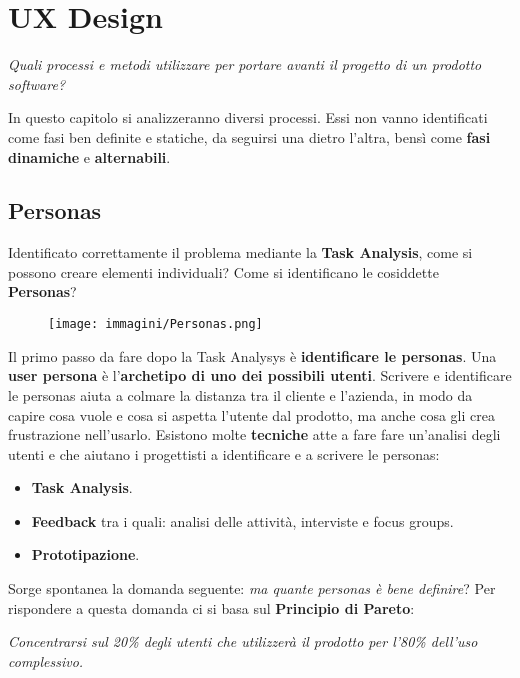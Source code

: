 \chapter{UX Design}
\begin{flushleft}
	\textit{Quali processi e metodi utilizzare per portare avanti il progetto di un prodotto software?}
\end{flushleft}

In questo capitolo si analizzeranno diversi processi.
Essi non vanno identificati come fasi ben definite e statiche, da seguirsi una dietro l'altra, bensì come \textbf{fasi} \textbf{dinamiche} e
\textbf{alternabili}.

\section{Personas}
Identificato correttamente il problema mediante la \textbf{Task Analysis}, come si  possono creare elementi individuali? Come si identificano le
cosiddette \textbf{Personas}?

\begin{figure}[!h]
	\centering
	\texttt{[image: immagini/Personas.png]}
\end{figure}

Il primo passo da fare dopo la Task Analysys è \textbf{identificare le personas}.
Una \textbf{user persona} è l'\textbf{archetipo di uno dei possibili utenti}. Scrivere e
identificare le personas aiuta a colmare la distanza tra il cliente e l'azienda, in modo da capire cosa vuole e cosa si aspetta l'utente dal prodotto,
ma anche cosa gli crea frustrazione nell'usarlo.
Esistono molte \textbf{tecniche} atte a fare fare un'analisi degli utenti e che aiutano i progettisti a identificare e a scrivere le personas:

\begin{itemize}
	\itemsep-0.3em
	\item \textbf{Task Analysis}.
	\item \textbf{Feedback} tra i quali: analisi delle attività, interviste e focus groups.
	\item \textbf{Prototipazione}.
\end{itemize}

Sorge spontanea la domanda seguente: \textit{ma quante personas è bene definire}?
Per rispondere a questa domanda ci si basa sul \textbf{Principio di Pareto}:

\textit{Concentrarsi sul 20\% degli utenti che utilizzerà il prodotto per l'80\% dell'uso complessivo.}

